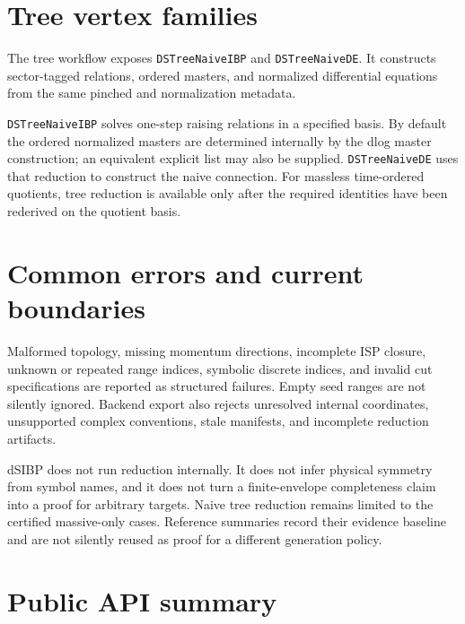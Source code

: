 ﻿\documentclass[a4paper,11pt]{article}
\begin{document}
\section{Tree vertex families}

The tree workflow exposes \texttt{DSTreeNaiveIBP} and \texttt{DSTreeNaiveDE}. It constructs
sector-tagged relations, ordered masters, and normalized differential equations from the
same pinched and normalization metadata.

\texttt{DSTreeNaiveIBP} solves one-step raising relations in a specified basis. By default
the ordered normalized masters are determined internally by the dlog master construction;
an equivalent explicit list may also be supplied.
\texttt{DSTreeNaiveDE} uses that reduction to construct the naive connection. For massless
time-ordered quotients, tree reduction is available only after the required identities have
been rederived on the quotient basis.

\section{Common errors and current boundaries}

Malformed topology, missing momentum directions, incomplete ISP closure, unknown or
repeated range indices, symbolic discrete indices, and invalid cut specifications are
reported as structured failures. Empty seed ranges are not silently ignored. Backend export
also rejects unresolved internal coordinates, unsupported complex conventions, stale
manifests, and incomplete reduction artifacts.

dSIBP does not run reduction internally. It does not infer physical symmetry from symbol
names, and it does not turn a finite-envelope completeness claim into a proof for arbitrary
targets. Naive tree reduction remains limited to the certified massive-only
cases. Reference summaries record their evidence baseline and are not silently
reused as proof for a different generation policy.

\section{Public API summary}
\end{document}
